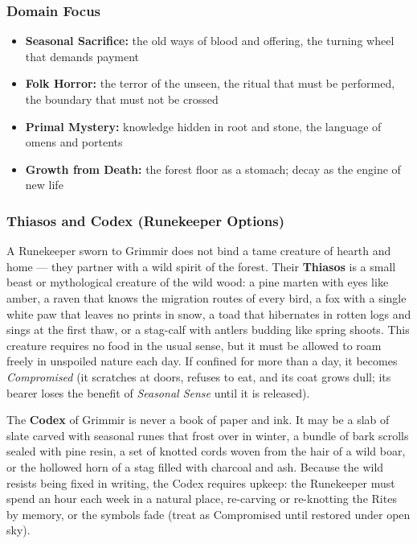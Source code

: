 \subsubsection*{Domain Focus}
\begin{itemize}
  \item \textbf{Seasonal Sacrifice:} the old ways of blood and offering, the turning wheel that demands payment
  \item \textbf{Folk Horror:} the terror of the unseen, the ritual that must be performed, the boundary that must not be crossed
  \item \textbf{Primal Mystery:} knowledge hidden in root and stone, the language of omens and portents
  \item \textbf{Growth from Death:} the forest floor as a stomach; decay as the engine of new life
\end{itemize}

\subsubsection*{Thiasos and Codex (Runekeeper Options)}

A Runekeeper sworn to Grimmir does not bind a tame creature of hearth and home --- they partner with a wild spirit of the forest. Their \textbf{Thiasos} is a small beast or mythological creature of the wild wood: a pine marten with eyes like amber, a raven that knows the migration routes of every bird, a fox with a single white paw that leaves no prints in snow, a toad that hibernates in rotten logs and sings at the first thaw, or a stag-calf with antlers budding like spring shoots. This creature requires no food in the usual sense, but it must be allowed to roam freely in unspoiled nature each day. If confined for more than a day, it becomes \textit{Compromised} (it scratches at doors, refuses to eat, and its coat grows dull; its bearer loses the benefit of \textit{Seasonal Sense} until it is released).

The \textbf{Codex} of Grimmir is never a book of paper and ink. It may be a slab of slate carved with seasonal runes that frost over in winter, a bundle of bark scrolls sealed with pine resin, a set of knotted cords woven from the hair of a wild boar, or the hollowed horn of a stag filled with charcoal and ash. Because the wild resists being fixed in writing, the Codex requires upkeep: the Runekeeper must spend an hour each week in a natural place, re-carving or re-knotting the Rites by memory, or the symbols fade (treat as Compromised until restored under open sky).

